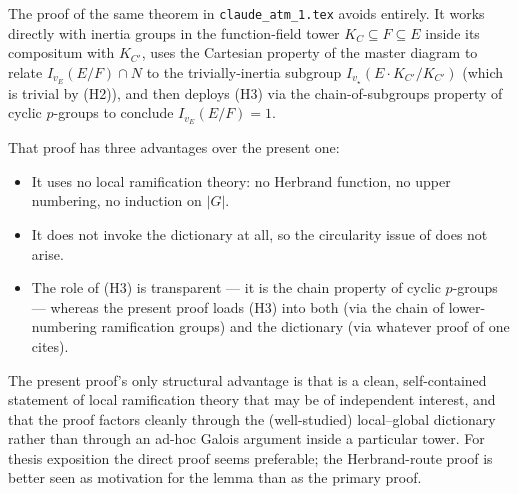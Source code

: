 \documentclass[11pt]{article}
\begin{document}
\begin{remark}
The proof of the same theorem in \texttt{claude\_atm\_1.tex} avoids
 entirely. It works directly with inertia groups in the
function-field tower $K_C \subseteq F \subseteq E$ inside its compositum with
$K_{C'}$, uses the Cartesian property of the master diagram to relate
$I_{v_E}(E/F) \cap N$ to the trivially-inertia subgroup
$I_{v_\star}(E\cdot K_{C'}/K_{C'})$ (which is trivial by (H2)), and then
deploys (H3) via the chain-of-subgroups property of cyclic $p$-groups to
conclude $I_{v_E}(E/F) = 1$.

That proof has three advantages over the present one:
\begin{itemize}
  \item It uses no local ramification theory: no Herbrand function, no upper
        numbering, no induction on $|G|$.
  \item It does not invoke the dictionary at all, so the circularity issue of
         does not arise.
  \item The role of (H3) is transparent --- it is the chain property of cyclic
        $p$-groups --- whereas the present proof loads (H3) into both
         (via the chain of lower-numbering
        ramification groups) and the dictionary (via whatever proof of
         one cites).
\end{itemize}
The present proof's only structural advantage is that
 is a clean, self-contained statement of local
ramification theory that may be of independent interest, and that the proof
factors cleanly through the (well-studied) local--global dictionary rather
than through an ad-hoc Galois argument inside a particular tower. For thesis
exposition the direct proof seems preferable; the Herbrand-route proof is
better seen as motivation for the lemma than as the primary proof.
\end{remark}

\printbibliography
\end{document}
